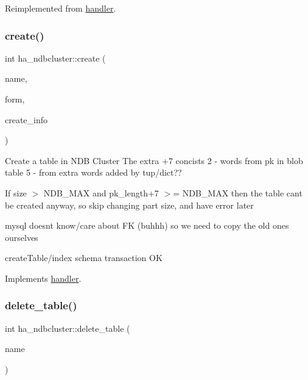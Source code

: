 Reimplemented from \mbox{\hyperlink{classhandler_a5e765264bd31e0519e03e1bd53d8c6d2}{handler}}.

\mbox{\label{classha__ndbcluster_ac74383fcb359c0f2d06acf101bb4d4b0}} 
\subsubsection{\texorpdfstring{create()}{create()}}
{\footnotesize\ttfamily int ha\+\_\+ndbcluster\+::create (\begin{DoxyParamCaption}\item[{const char $\ast$}]{name,  }\item[{\mbox{\hyperlink{structTABLE}{T\+A\+B\+LE}} $\ast$}]{form,  }\item[{\mbox{\hyperlink{structst__ha__create__information}{H\+A\+\_\+\+C\+R\+E\+A\+T\+E\+\_\+\+I\+N\+FO}} $\ast$}]{create\+\_\+info }\end{DoxyParamCaption})\hspace{0.3cm}{\ttfamily [virtual]}}

Create a table in N\+DB Cluster The extra +7 concists 2 -\/ words from pk in blob table 5 -\/ from extra words added by tup/dict??

If size $>$ N\+D\+B\+\_\+\+M\+AX and pk\+\_\+length+7 $>$= N\+D\+B\+\_\+\+M\+AX then the table can\textquotesingle{}t be created anyway, so skip changing part size, and have error later

mysql doesnt know/care about FK (buhhh) so we need to copy the old ones ourselves

create\+Table/index schema transaction OK

Implements \mbox{\hyperlink{classhandler}{handler}}.

\mbox{\label{classha__ndbcluster_a4d32721908372dc62c490e14a005e03c}} 
\subsubsection{\texorpdfstring{delete\+\_\+table()}{delete\_table()}}
{\footnotesize\ttfamily int ha\+\_\+ndbcluster\+::delete\+\_\+table (\begin{DoxyParamCaption}\item[{const char $\ast$}]{name }\end{DoxyParamCaption})\hspace{0.3cm}{\ttfamily [virtual]}}

